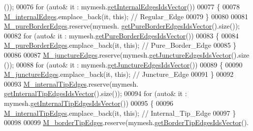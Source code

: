 \begin{DoxyCode}
      ());
00076     \textcolor{keywordflow}{for} (\textcolor{keyword}{auto}& it : mymesh.\hyperlink{classFVCode3D_1_1Rigid__Mesh_aa6978e883bc7ef09478a0c85c25fabb2}{getInternalEdgesIdsVector}())
00077     \{
00078         \hyperlink{classFVCode3D_1_1Rigid__Mesh_a3b689233b2590d76d663195b89d380fb}{M\_internalEdges}.emplace\_back(it, \textcolor{keyword}{this}); \textcolor{comment}{// Regular\_Edge}
00079     \}
00080 
00081     \hyperlink{classFVCode3D_1_1Rigid__Mesh_a72e5bc2acebdc3bca417fa55dfd4c8c0}{M\_pureBorderEdges}.reserve(mymesh.
      \hyperlink{classFVCode3D_1_1Rigid__Mesh_ad18503d8be34525dd4ccbd7d6bc972c0}{getPureBorderEdgesIdsVector}().size());
00082     \textcolor{keywordflow}{for} (\textcolor{keyword}{auto}& it : mymesh.\hyperlink{classFVCode3D_1_1Rigid__Mesh_ad18503d8be34525dd4ccbd7d6bc972c0}{getPureBorderEdgesIdsVector}())
00083     \{
00084         \hyperlink{classFVCode3D_1_1Rigid__Mesh_a72e5bc2acebdc3bca417fa55dfd4c8c0}{M\_pureBorderEdges}.emplace\_back(it, \textcolor{keyword}{this}); \textcolor{comment}{// Pure\_Border\_Edge}
00085     \}
00086 
00087     \hyperlink{classFVCode3D_1_1Rigid__Mesh_a01850de43f4d5d1dcf617d7697bcf3e8}{M\_junctureEdges}.reserve(mymesh.\hyperlink{classFVCode3D_1_1Rigid__Mesh_ab5e13da1e797fbbb301b15272a96c27a}{getJunctureEdgesIdsVector}().size
      ());
00088     \textcolor{keywordflow}{for} (\textcolor{keyword}{auto}& it : mymesh.\hyperlink{classFVCode3D_1_1Rigid__Mesh_ab5e13da1e797fbbb301b15272a96c27a}{getJunctureEdgesIdsVector}())
00089     \{
00090         \hyperlink{classFVCode3D_1_1Rigid__Mesh_a01850de43f4d5d1dcf617d7697bcf3e8}{M\_junctureEdges}.emplace\_back(it, \textcolor{keyword}{this}); \textcolor{comment}{// Juncture\_Edge}
00091     \}
00092 
00093     \hyperlink{classFVCode3D_1_1Rigid__Mesh_a15cb042bfb5d94c4ce34f20d1e92ebb5}{M\_internalTipEdges}.reserve(mymesh.
      \hyperlink{classFVCode3D_1_1Rigid__Mesh_a167962718f17ff75f349a1a072d1627b}{getInternalTipEdgesIdsVector}().size());
00094     \textcolor{keywordflow}{for} (\textcolor{keyword}{auto}& it : mymesh.\hyperlink{classFVCode3D_1_1Rigid__Mesh_a167962718f17ff75f349a1a072d1627b}{getInternalTipEdgesIdsVector}())
00095     \{
00096         \hyperlink{classFVCode3D_1_1Rigid__Mesh_a15cb042bfb5d94c4ce34f20d1e92ebb5}{M\_internalTipEdges}.emplace\_back(it, \textcolor{keyword}{this}); \textcolor{comment}{// Internal\_Tip\_Edge}
00097     \}
00098 
00099     \hyperlink{classFVCode3D_1_1Rigid__Mesh_a712ea50f5237025e92af21799c5ec31b}{M\_borderTipEdges}.reserve(mymesh.\hyperlink{classFVCode3D_1_1Rigid__Mesh_a12c92b683cfb3d9ac2645f038a8c6220}{getBorderTipEdgesIdsVector}().

\end{DoxyCode}
